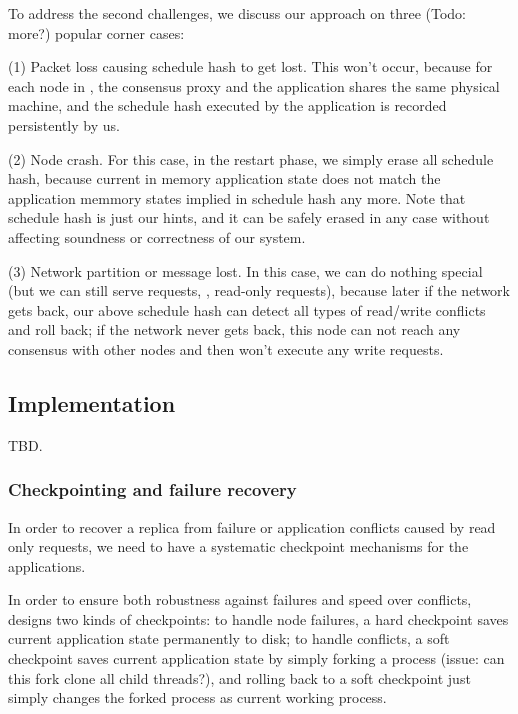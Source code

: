 To address the second challenges, we discuss our approach on three (Todo: more?) popular 
corner cases:

(1) Packet loss causing schedule hash to get lost. This won't occur, because 
for each node in \msmr, the consensus proxy and the application shares the same 
physical machine, and the schedule hash executed by the application is recorded 
persistently by us.

(2) Node crash. For this case, in the restart phase, we simply erase all 
schedule hash, because current in memory application state does not match the 
application memmory states implied in schedule hash any more. Note that 
schedule hash is just our hints, and it can be safely erased in any case 
without affecting soundness or correctness of our system.

(3) Network partition or \paxos message lost. In this case, we can do nothing 
special (but we can still serve requests, \eg, read-only requests), because 
later if the network gets back, our above schedule hash can detect all types of 
read/write conflicts and roll back; if the network never gets back, this node 
can not reach any consensus with other nodes and then won't execute any write 
requests.



\subsection{Implementation} \label{sec:rep-impl}
TBD.

\subsubsection{Checkpointing and failure recovery} \label{sec:rep-checkpoint}
In order to recover a replica from failure or application conflicts caused by 
read only requests, we need to have a systematic checkpoint mechanisms for the applications.

In order to ensure both robustness against failures and speed over conflicts, 
\msmr designs two kinds of checkpoints: to handle node failures, a hard checkpoint saves current application 
state permanently to 
disk; to handle conflicts, a soft checkpoint saves current application state by 
simply forking a process (issue: can this fork clone all child threads?), and 
rolling back to a soft checkpoint just simply changes the forked process as 
current working process.

